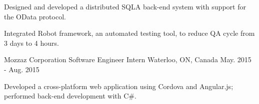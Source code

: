 \begin{cventries}
{\begin{cvitems}
\item {Designed and developed a distributed SQLA back-end system with support for the OData protocol.}
\item {Integrated Robot framework, an automated testing tool, to reduce QA cycle from 3 days to 4 hours.}
\end{cvitems}
}
\cventry
{Mozzaz Corporation} %
{Software Engineer Intern} %
{Waterloo, ON, Canada} %
{May. 2015 - Aug. 2015} %
{ %
\begin{cvitems}
\item {Developed a cross-platform web application using Cordova and Angular.js; performed back-end development with C\#.}
\end{cvitems}
}

\end{cventries}
